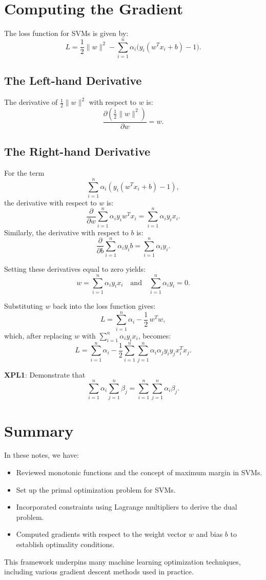 \section{Computing the Gradient}

The loss function for SVMs is given by:
\[
L = \frac{1}{2}\|w\|^2 - \sum_{i=1}^{n} \alpha_i \bigl( y_i (w^T x_i + b) - 1 \bigr).
\]

\subsection{The Left-hand Derivative}
The derivative of \(\frac{1}{2}\|w\|^2\) with respect to \(w\) is:
\[
\frac{\partial \left(\frac{1}{2}\|w\|^2\right)}{\partial w} = w.
\]

\subsection{The Right-hand Derivative}
For the term 
\[
\sum_{i=1}^{n} \alpha_i (y_i(w^T x_i + b) - 1),
\]
the derivative with respect to \(w\) is:
\[
\frac{\partial}{\partial w} \sum_{i=1}^{n} \alpha_i y_i w^T x_i = \sum_{i=1}^{n} \alpha_i y_i x_i.
\]
Similarly, the derivative with respect to \(b\) is:
\[
\frac{\partial}{\partial b} \sum_{i=1}^{n} \alpha_i y_i b = \sum_{i=1}^{n} \alpha_i y_i.
\]

Setting these derivatives equal to zero yields:
\[
w = \sum_{i=1}^{n} \alpha_i y_i x_i \quad \text{and} \quad \sum_{i=1}^{n} \alpha_i y_i = 0.
\]

Substituting \(w\) back into the loss function gives:
\[
L = \sum_{i=1}^{n} \alpha_i - \frac{1}{2}\, w^T w,
\]
which, after replacing \(w\) with \(\sum_{i=1}^{n} \alpha_i y_i x_i\), becomes:
\[
L = \sum_{i=1}^{n} \alpha_i - \frac{1}{2} \sum_{i=1}^{n} \sum_{j=1}^{n} \alpha_i \alpha_j y_i y_j x_i^T x_j.
\]

\begin{tcolorbox}
\textbf{XPL1}: Demonstrate that 
\[
\sum_{i=1}^n \alpha_i \sum_{j=1}^n \beta_j = \sum_{i=1}^n \sum_{j=1}^n \alpha_i\beta_j.
\]
\end{tcolorbox}

\section{Summary}
In these notes, we have:
\begin{itemize}
    \item Reviewed monotonic functions and the concept of maximum margin in SVMs.
    \item Set up the primal optimization problem for SVMs.
    \item Incorporated constraints using Lagrange multipliers to derive the dual problem.
    \item Computed gradients with respect to the weight vector \(w\) and bias \(b\) to establish optimality conditions.
\end{itemize}

This framework underpins many machine learning optimization techniques, including various gradient descent methods used in practice.
